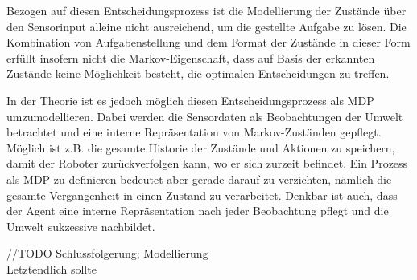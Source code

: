 Bezogen auf diesen Entscheidungsprozess ist die Modellierung der Zustände über den Sensorinput alleine nicht ausreichend, um die gestellte Aufgabe zu lösen. Die Kombination von Aufgabenstellung und dem Format der Zustände in dieser Form erfüllt insofern nicht die Markov-Eigenschaft, dass auf Basis der erkannten Zustände keine Möglichkeit besteht, die optimalen Entscheidungen zu treffen. 
\par

In der Theorie ist es jedoch möglich diesen Entscheidungsprozess als MDP umzumodellieren. Dabei werden die Sensordaten als Beobachtungen der Umwelt betrachtet und eine interne Repräsentation von Markov-Zuständen gepflegt. Möglich ist z.B. die gesamte Historie der Zustände und Aktionen zu speichern, damit der Roboter zurückverfolgen kann, wo er sich zurzeit befindet. Ein Prozess als MDP zu definieren bedeutet aber gerade darauf zu verzichten, nämlich die gesamte Vergangenheit in einen Zustand zu verarbeitet. Denkbar ist auch, dass der Agent eine interne Repräsentation nach jeder Beobachtung pflegt und die Umwelt suk­zes­si­ve nachbildet.
\par 
//TODO Schlussfolgerung; Modellierung
\\
Letztendlich sollte 


